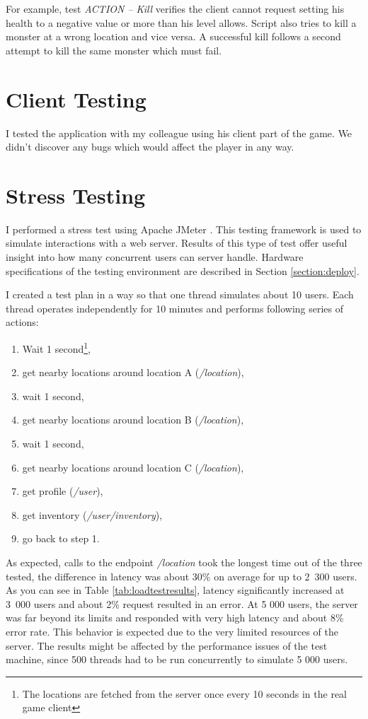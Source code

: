 For example, test \textit{ACTION -- Kill} verifies the client cannot request setting his health to a negative value or more than his level allows. Script also tries to kill a monster at a wrong location and vice versa. A successful kill follows a second attempt to kill the same monster which must fail. 


\section{Client Testing}
I tested the application with my colleague using his client part of the game. We didn't discover any bugs which would affect the player in any way.

\section{Stress Testing}
I performed a stress test using Apache JMeter \cite{jmeter}. This testing framework is used to simulate interactions with a web server. Results of this type of test offer useful insight into how many concurrent users can server handle. Hardware specifications of the testing environment are described in Section \ref{section:deploy}.

I created a test plan in a way so that one thread simulates about 10 users. Each thread operates independently for 10 minutes and performs following series of actions:
\begin{enumerate}
	\item Wait 1 second\footnote{The locations are fetched from the server once every 10 seconds in the real game client},
	\item get nearby locations around location A (\textit{/location}),
	\item wait 1 second,
	\item get nearby locations around location B (\textit{/location}),
	\item wait 1 second,
	\item get nearby locations around location C (\textit{/location}),
	\item get profile (\textit{/user}),
	\item get inventory (\textit{/user/inventory}),
	\item go back to step 1.
\end{enumerate}

 As expected, calls to the endpoint \textit{/location} took the longest time out of the three tested, the difference in latency was about 30\% on average for up to 2~300 users. As you can see in Table \ref{tab:loadtestresults}, latency significantly increased at 3~000 users and about 2\% request resulted in an error. At 5 000 users, the server was far beyond its limits and responded with very high latency and about 8\% error rate. This behavior is expected due to the very limited resources of the server. The results might be affected by the performance issues of the test machine, since 500 threads had to be run concurrently to simulate 5 000 users.

